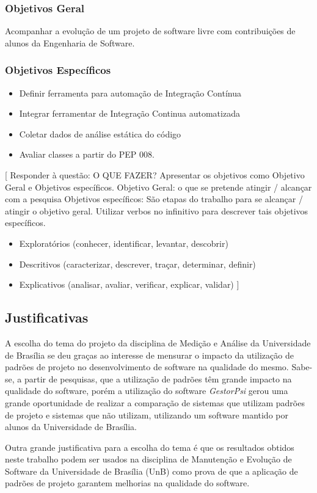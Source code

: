 \subsubsection{Objetivos Geral}

Acompanhar a evolução de um projeto de software livre com contribuições de alunos
da Engenharia de Software.

\subsubsection{Objetivos Específicos}
\begin{itemize}
	\item Definir ferramenta para automação de Integração Contínua
	\item Integrar ferramentar de Integração Continua automatizada
	\item Coletar dados de análise estática do código
	\item Avaliar classes a partir do PEP 008.
\end{itemize}
[ Responder à questão: O QUE FAZER?
Apresentar os objetivos como Objetivo Geral e Objetivos específicos.
Objetivo Geral: o que se pretende atingir / alcançar com a pesquisa
Objetivos específicos: São etapas do trabalho para se alcançar / atingir o objetivo geral. Utilizar verbos no infinitivo para descrever tais objetivos específicos.
\begin{itemize}
	\item Exploratórios (conhecer, identificar, levantar, descobrir)
	\item Descritivos (caracterizar, descrever, traçar, determinar, definir)
	\item Explicativos (analisar, avaliar, verificar, explicar, validar)   ]
\end{itemize}


\subsection{Justificativas} %
\label{sub:justificativas}

A escolha do tema do projeto da disciplina de Medição e Análise da Universidade de Brasília se deu graças ao interesse de mensurar o impacto da utilização de padrões de projeto no desenvolvimento de software na qualidade do mesmo. Sabe-se, a partir de pesquisas, que a utilização de padrões têm grande impacto na qualidade do software, porém a utilização do software \textit{GestorPsi} gerou uma grande oportunidade de realizar a comparação de sistemas que utilizam padrões de projeto e sistemas que não utilizam, utilizando um software mantido por alunos da Universidade de Brasília.

Outra grande justificativa para a escolha do tema é que os resultados obtidos neste trabalho podem ser usados na disciplina de Manutenção e Evolução de Software da Universidade de Brasília (UnB) como prova de que a aplicação de padrões de projeto garantem melhorias na qualidade do software.
